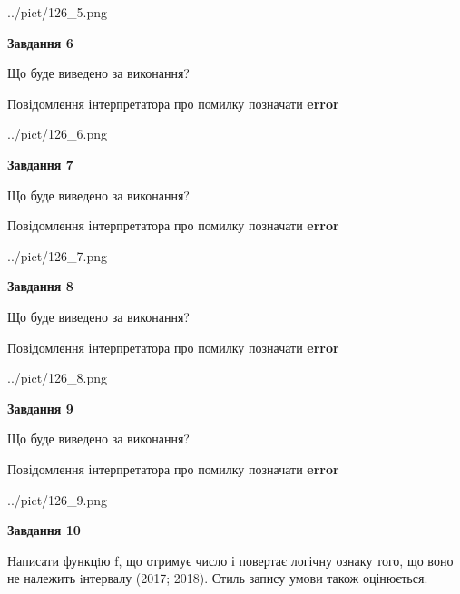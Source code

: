 \documentclass[12pt, ukrainian]{article}
\begin{document}
{\begin {large}
\begin{center}
	{../pict/126_5.png}
\end{center}
\newpage

{\begin {center}\textbf{Завдання 6}\end {center}}\par
Що буде виведено за виконання? \par
Повідомлення інтерпретатора про помилку позначати \textbf{error}

\begin{center}
	{../pict/126_6.png}
\end{center}
\newpage

{\begin {center}\textbf{Завдання 7}\end {center}}\par
Що буде виведено за виконання? \par
Повідомлення інтерпретатора про помилку позначати \textbf{error}

\begin{center}
	{../pict/126_7.png}
\end{center}
\newpage

{\begin {center}\textbf{Завдання 8}\end {center}}\par
Що буде виведено за виконання? \par
Повідомлення інтерпретатора про помилку позначати \textbf{error}

\begin{center}
	{../pict/126_8.png}
\end{center}
\newpage

{\begin {center}\textbf{Завдання 9}\end {center}}\par
Що буде виведено за виконання? \par
Повідомлення інтерпретатора про помилку позначати \textbf{error}

\begin{center}
	{../pict/126_9.png}
\end{center}
\newpage

{\begin {center}\textbf{Завдання 10}\end {center}}\par

Написати функцiю f, що отримує число і повертає логічну ознаку того, що воно не належить iнтервалу (2017; 2018). Стиль запису умови також оцінюється.\par
\newpage

\end {large}}
\end{document}
